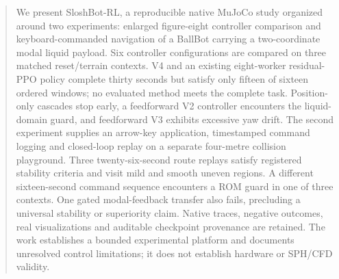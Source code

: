 \begin{abstract}
We present SloshBot-RL, a reproducible native MuJoCo study organized around two experiments: enlarged figure-eight controller comparison and keyboard-commanded navigation of a BallBot carrying a two-coordinate modal liquid payload. Six controller configurations are compared on three matched reset/terrain contexts. V4 and an existing eight-worker residual-PPO policy complete thirty seconds but satisfy only fifteen of sixteen ordered windows; no evaluated method meets the complete task. Position-only cascades stop early, a feedforward V2 controller encounters the liquid-domain guard, and feedforward V3 exhibits excessive yaw drift. The second experiment supplies an arrow-key application, timestamped command logging and closed-loop replay on a separate four-metre collision playground. Three twenty-six-second route replays satisfy registered stability criteria and visit mild and smooth uneven regions. A different sixteen-second command sequence encounters a ROM guard in one of three contexts. One gated modal-feedback transfer also fails, precluding a universal stability or superiority claim. Native traces, negative outcomes, real visualizations and auditable checkpoint provenance are retained. The work establishes a bounded experimental platform and documents unresolved control limitations; it does not establish hardware or SPH/CFD validity.
\end{abstract}
